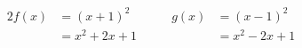 \begin{alignat*}{2}
 f(x)&=\left(x+1\right)^2
 &\qquad g(x)&=\left(x-1\right)^2\\
     &=x^2+2x+1
 &          &=x^2-2x+1
\end{alignat*}
